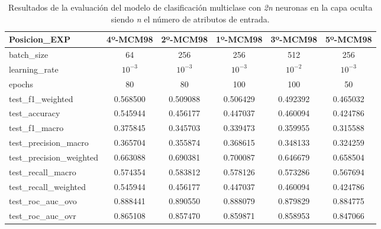 \begin{table}[H]
\begin{tabular}{|>{\columncolor[HTML]{E0FFFF}}l|c|c|c|c|c|}
\hline
Posicion\_EXP & 4º-MCM98 & 2º-MCM98 & 1º-MCM98 & 3º-MCM98 & 5º-MCM98 \\
\hline
\cellcolor[HTML]{E0FFFF}batch\_size & \cellcolor[HTML]{66ffa8}64 & \cellcolor[HTML]{66ffa8}256 & \cellcolor[HTML]{66ffa8}256 & \cellcolor[HTML]{66ffa8}512 & \cellcolor[HTML]{66ffa8}256 \\
\cellcolor[HTML]{E0FFFF}learning\_rate & \cellcolor[HTML]{f99595}$10^{-3}$ & \cellcolor[HTML]{f99595}$10^{-3}$ & \cellcolor[HTML]{f99595}$10^{-3}$ & \cellcolor[HTML]{f99595}$10^{-2}$ & \cellcolor[HTML]{f99595}$10^{-3}$ \\
\cellcolor[HTML]{E0FFFF}epochs & \cellcolor[HTML]{b1bafb}80 & \cellcolor[HTML]{b1bafb}80 & \cellcolor[HTML]{b1bafb}100 & \cellcolor[HTML]{b1bafb}100 & \cellcolor[HTML]{b1bafb}50 \\
\cellcolor[HTML]{E0FFFF}test\_f1\_weighted & 0.568500 & 0.509088 & 0.506429 & 0.492392 & 0.465032 \\
\cellcolor[HTML]{E0FFFF}test\_accuracy & 0.545944 & 0.456177 & 0.447037 & 0.460094 & 0.424786 \\
\cellcolor[HTML]{E0FFFF}test\_f1\_macro & 0.375845 & 0.345703 & 0.339473 & 0.359955 & 0.315588 \\
\cellcolor[HTML]{E0FFFF}test\_precision\_macro & 0.365704 & 0.355874 & 0.368615 & 0.348133 & 0.324259 \\
\cellcolor[HTML]{E0FFFF}test\_precision\_weighted & 0.663088 & 0.690381 & 0.700087 & 0.646679 & 0.658504 \\
\cellcolor[HTML]{E0FFFF}test\_recall\_macro & 0.574354 & 0.583812 & 0.578126 & 0.573286 & 0.567694 \\
\cellcolor[HTML]{E0FFFF}test\_recall\_weighted & 0.545944 & 0.456177 & 0.447037 & 0.460094 & 0.424786 \\
\cellcolor[HTML]{E0FFFF}test\_roc\_auc\_ovo & 0.888441 & 0.890550 & 0.888079 & 0.879829 & 0.884775 \\
\cellcolor[HTML]{E0FFFF}test\_roc\_auc\_ovr & 0.865108 & 0.857470 & 0.859871 & 0.858953 & 0.847066 \\
\hline
\end{tabular}
    \caption{Resultados de la evaluación del modelo de clasificación multiclase con \textit{2n} neuronas en la capa oculta siendo \textit{n} el número de atributos de entrada.}
    \label{fig:EVALMCM98}
\end{table}

